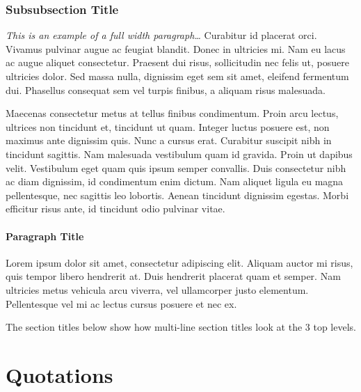 \documentclass[
	a4paper, %
	12pt, %
]{include/CSSullivanBusinessReport}
\begin{document}
\subsubsection{Subsubsection Title} %

\begin{fullwidth} %
	\textit{This is an example of a full width paragraph\ldots} Curabitur id placerat orci. Vivamus pulvinar augue ac feugiat blandit. Donec in ultricies mi. Nam eu lacus ac augue aliquet consectetur. Praesent dui risus, sollicitudin nec felis ut, posuere ultricies dolor. Sed massa nulla, dignissim eget sem sit amet, eleifend fermentum dui. Phasellus consequat sem vel turpis finibus, a aliquam risus malesuada.
\end{fullwidth}

Maecenas consectetur metus at tellus finibus condimentum. Proin arcu lectus, ultrices non tincidunt et, tincidunt ut quam. Integer luctus posuere est, non maximus ante dignissim quis. Nunc a cursus erat. Curabitur suscipit nibh in tincidunt sagittis. Nam malesuada vestibulum quam id gravida. Proin ut dapibus velit. Vestibulum eget quam quis ipsum semper convallis. Duis consectetur nibh ac diam dignissim, id condimentum enim dictum. Nam aliquet ligula eu magna pellentesque, nec sagittis leo lobortis. Aenean tincidunt dignissim egestas. Morbi efficitur risus ante, id tincidunt odio pulvinar vitae.

\paragraph{Paragraph Title} %

Lorem ipsum dolor sit amet, consectetur adipiscing elit. Aliquam auctor mi risus, quis tempor libero hendrerit at. Duis hendrerit placerat quam et semper. Nam ultricies metus vehicula arcu viverra, vel ullamcorper justo elementum. Pellentesque vel mi ac lectus cursus posuere et nec ex.

The section titles below show how multi-line section titles look at the 3 top levels.



\section{Quotations}
\end{document}
